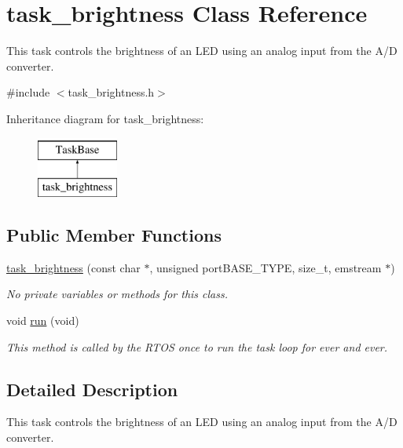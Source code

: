 \hypertarget{classtask__brightness}{\section{task\-\_\-brightness Class Reference}
\label{classtask__brightness}
}


This task controls the brightness of an L\-E\-D using an analog input from the A/\-D converter.  




{\ttfamily \#include $<$task\-\_\-brightness.\-h$>$}

Inheritance diagram for task\-\_\-brightness\-:\begin{figure}[H]
\begin{center}
\leavevmode
\includegraphics[height=2.000000cm]{classtask__brightness}
\end{center}
\end{figure}
\subsection*{Public Member Functions}
\begin{DoxyCompactItemize}
\item 
\hyperlink{classtask__brightness_a5802baf3a0c9fe53ccbce8966d1fad47}{task\-\_\-brightness} (const char $\ast$, unsigned port\-B\-A\-S\-E\-\_\-\-T\-Y\-P\-E, size\-\_\-t, emstream $\ast$)
\begin{DoxyCompactList}\small\item\em No private variables or methods for this class. \end{DoxyCompactList}\item 
void \hyperlink{classtask__brightness_a615beac07a99f0856f048a46fd9a3898}{run} (void)
\begin{DoxyCompactList}\small\item\em This method is called by the R\-T\-O\-S once to run the task loop for ever and ever. \end{DoxyCompactList}\end{DoxyCompactItemize}


\subsection{Detailed Description}
This task controls the brightness of an L\-E\-D using an analog input from the A/\-D converter. 

